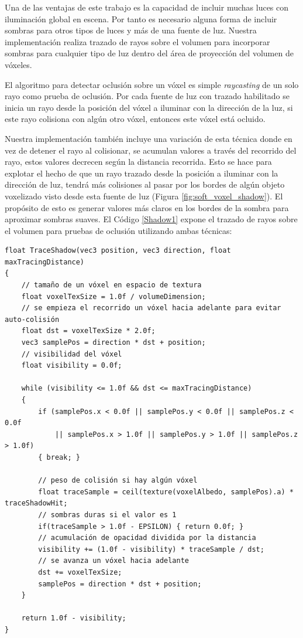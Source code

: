 Una de las ventajas de este trabajo es la capacidad de incluir muchas luces con iluminación global en escena. Por tanto es necesario alguna forma de incluir sombras para otros tipos de luces y más de una fuente de luz. Nuestra implementación realiza trazado de rayos sobre el volumen para incorporar sombras para cualquier tipo de luz dentro del área de proyección del volumen de vóxeles.

El algoritmo para detectar oclusión sobre un vóxel es simple \emph{raycasting} de un solo rayo como prueba de oclusión. Por cada fuente de luz con trazado habilitado se inicia un rayo desde la posición del vóxel a iluminar con la dirección de la luz, si este rayo colisiona con algún otro vóxel, entonces este vóxel está ocluido.

Nuestra implementación también incluye una variación de esta técnica donde en vez de detener el rayo al colisionar, se acumulan valores a través del recorrido del rayo, estos valores decrecen según la distancia recorrida. Esto se hace para explotar el hecho de que un rayo trazado desde la posición a iluminar con la dirección de luz, tendrá más colisiones al pasar por los bordes de algún objeto voxelizado visto desde esta fuente de luz (Figura \ref{fig:soft_voxel_shadow}). El propósito de esto es generar valores más claros en los bordes de la sombra para aproximar sombras suaves. El Código \ref{Shadow1} expone el trazado de rayos sobre el volumen para pruebas de oclusión utilizando ambas técnicas:
\\
\begin{lstlisting}[caption={Trazado de rayos sobre volumen albedo para sombras sobre vóxeles}, label=Shadow1]
float TraceShadow(vec3 position, vec3 direction, float maxTracingDistance) 
{
    // tamaño de un vóxel en espacio de textura
    float voxelTexSize = 1.0f / volumeDimension;
    // se empieza el recorrido un vóxel hacia adelante para evitar auto-colisión
    float dst = voxelTexSize * 2.0f;
    vec3 samplePos = direction * dst + position;
    // visibilidad del vóxel
    float visibility = 0.0f;

    while (visibility <= 1.0f && dst <= maxTracingDistance) 
    {
        if (samplePos.x < 0.0f || samplePos.y < 0.0f || samplePos.z < 0.0f
            || samplePos.x > 1.0f || samplePos.y > 1.0f || samplePos.z > 1.0f) 
        { break; }
        
        // peso de colisión si hay algún vóxel
        float traceSample = ceil(texture(voxelAlbedo, samplePos).a) * traceShadowHit;
        // sombras duras si el valor es 1
        if(traceSample > 1.0f - EPSILON) { return 0.0f; }
        // acumulación de opacidad dividida por la distancia
        visibility += (1.0f - visibility) * traceSample / dst;
        // se avanza un vóxel hacia adelante
        dst += voxelTexSize;
        samplePos = direction * dst + position;
    }

    return 1.0f - visibility;
}
\end{lstlisting}

